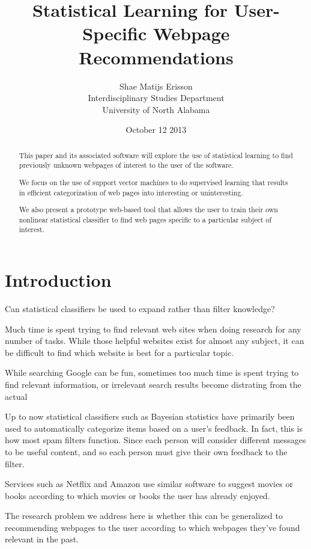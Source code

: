 \documentclass[12pt]{article}
\author{Shae Matijs Erisson\\Interdisciplinary Studies Department\\University of North Alabama}
\title{Statistical Learning for User-Specific Webpage Recommendations}
\begin{document}
\date{October 12 2013}
\maketitle{}
\pagebreak{}

\begin{abstract}
  This paper and its associated software will explore the use of statistical learning to find previously
  unknown webpages of interest to the user of the software.

  We focus on the use of support vector machines to do supervised learning that results in efficient
  categorization of web pages into interesting or uninteresting.

  We also present a prototype web-based tool that allows the user to train their own nonlinear statistical
  classifier to find web pages specific to a particular subject of interest.
\end{abstract}
\pagebreak{}
\section{Introduction}
Can statistical classifiers be used to expand rather than filter knowledge?

Much time is spent trying to find relevant web sites when doing research for any number of tasks. While those
helpful websites exist for almost any subject, it can be difficult to find which website is best for a
particular topic.

While searching Google can be fun, sometimes too much time is spent trying to find relevant information, or
irrelevant search results become distrating from the actual

Up to now statistical classifiers such as Bayesian statistics have primarily been used to automatically
categorize items based on a user's feedback. In fact, this is how most spam filters function. Since each
person will consider different messages to be useful content, and so each person must give their own feedback
to the filter.

Services such as Netflix and Amazon use similar software to suggest movies or books according to which movies
or books the user has already enjoyed.

The research problem we address here is whether this can be generalized to recommending webpages to the user
according to which webpages they've found relevant in the past.
\end{document}

